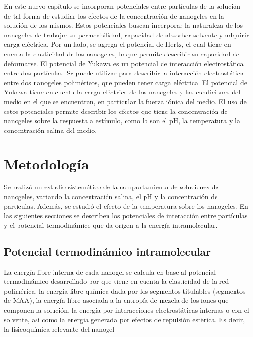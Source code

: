 	
	En este nuevo cap\'itulo se incorporan potenciales entre part\'iculas de la soluci\'on de tal forma de estudiar los efectos de la concentraci\'on de nanogeles en la soluci\'on de los mismos.
	Estos potenciales buscan incorporar la naturaleza de los nanogeles de trabajo: su permeabilidad, capacidad de absorber solvente y adquirir carga el\'ectrica.
	Por un lado, se agrega el potencial de Hertz, el cual tiene en cuenta la elasticidad de los nanogeles, lo que permite describir su capacidad de deformarse.
	El potencial de Yukawa es un potencial de interacci\'on electrost\'atica entre dos part\'iculas. Se puede utilizar para describir la interacci\'on electrost\'atica entre dos nanogeles polim\'ericos, que pueden tener carga el\'ectrica. El potencial de Yukawa tiene en cuenta la carga el\'ectrica de los nanogeles y las condiciones del medio en el que se encuentran, en particular la fuerza i\'onica del medio.
	El uso de estos potenciales permite describir los efectos que tiene la concentraci\'on de nanogeles sobre la respuesta a est\'imulo, como lo son el pH, la temperatura y la concentraci\'on salina del medio.
	
	
	
	
	
	\section{Metodolog\'ia}
	
	Se realiz\'o un estudio sistem\'atico de la comportamiento de soluciones de nanogeles, variando la concentraci\'on salina, el pH y la concentraci\'on de part\'iculas. Adem\'as, se estudi\'o  el efecto de la temperatura sobre los nanogeles. En las siguientes secciones se describen los potenciales de interacci\'on entre part\'iculas y el potencial termodin\'amico que da origen a la energ\'ia intramolecular. 
	
	
	
	\subsection{Potencial termodin\'amico intramolecular}
	
	La energ\'ia libre interna de cada nanogel se calcula en base al potencial termodin\'amico desarrollado por \citet{perez2021thermodynamic} que tiene en cuenta  la elasticidad de la red polim\'erica, la energ\'ia libre qu\'imica dada por los segmentos titulables (segmentos de MAA), la energ\'ia libre asociada a la entrop\'ia de mezcla de los iones que componen la soluci\'on, la energ\'ia por interacciones electrost\'aticas internas o con el solvente, as\'i como la energ\'ia generada por efectos de repulsi\'on est\'erica. Es decir, la fisicoqu\'imica relevante del nanogel
	
